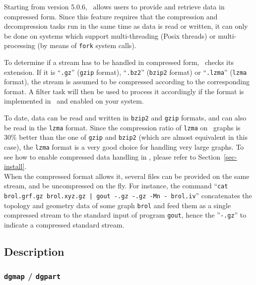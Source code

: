 Starting from version 5.0.6, \scotch\ allows users to provide and
retrieve data in compressed form. Since this feature requires that
the compression and decompression tasks run in the same time as data
is read or written, it can only be done on systems which support
multi-threading (Posix threads) or multi-processing (by means of
{\tt fork} system calls).

To determine if a stream has to be handled in compressed form,
\scotch\ checks its extension. If it is ``{\tt .gz}'' ({\tt gzip}
format), ``{\tt .bz2}'' ({\tt bzip2} format) or ``{\tt .lzma}''
({\tt lzma} format), the stream is assumed to be compressed according
to the corresponding format. A filter task will then be used to process
it accordingly if the format is implemented in \scotch\ and enabled on
your system.

To date, data can be read and written in {\tt bzip2} and {\tt gzip}
formats, and can also be read in the {\tt lzma} format. Since the
compression ratio of {\tt lzma} on \scotch\ graphs is $30\%$ better
than the one of {\tt gzip} and {\tt bzip2} (which are almost
equivalent in this case), the {\tt lzma} format is a very good choice
for handling very large graphs. To see how to enable compressed data
handling in \scotch, please refer to Section~\ref{sec-install}.
\\

When the compressed format allows it, several files can be provided on
the same stream, and be uncompressed on the fly. For instance, the
command ``{\tt cat brol.grf.gz brol.xyz.gz | gout -.gz -.gz -Mn -
brol.iv}'' concatenates the topology and geometry data of some graph
{\tt brol} and feed them as a single compressed stream to the standard
input of program {\tt gout}, hence the ''{\tt -.gz}'' to indicate a
compressed standard stream.

\subsection{Description}

\subsubsection{{\tt dgmap} / {\tt dgpart}}
\label{sec-prog-dgmap}

